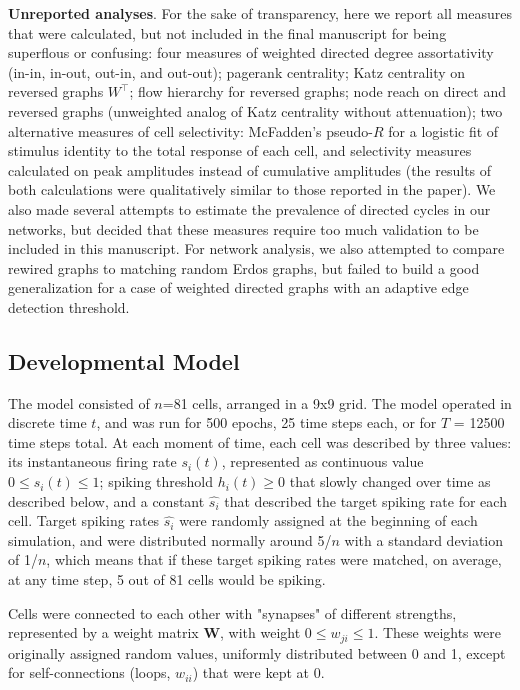 \documentclass{article}
\begin{document}
\textbf{Unreported analyses}. For the sake of transparency, here we report all measures that were calculated, but not included in the final manuscript for being superflous or confusing: four measures of weighted directed degree assortativity (in-in, in-out, out-in, and out-out); pagerank centrality; Katz centrality on reversed graphs $W^\top$; flow hierarchy for reversed graphs; node reach on direct and reversed graphs (unweighted analog of Katz centrality without attenuation); two alternative measures of cell selectivity: McFadden’s pseudo-$R$ for a logistic fit of stimulus identity to the total response of each cell, and selectivity measures calculated on peak amplitudes instead of cumulative amplitudes (the results of both calculations were qualitatively similar to those reported in the paper). We also made several attempts to estimate the prevalence of directed cycles in our networks, but decided that these measures require too much validation to be included in this manuscript. For network analysis, we also attempted to compare rewired graphs to matching random Erdos graphs, but failed to build a good generalization for a case of weighted directed graphs with an adaptive edge detection threshold.

\subsection*{Developmental Model}

The model consisted of $n$=81 cells, arranged in a 9x9 grid. The model operated in discrete time $t$, and was run for 500 epochs, 25 time steps each, or for $T$ = 12500 time steps total. At each moment of time, each cell was described by three values: its instantaneous firing rate $s_i(t)$, represented as continuous value $0 \leqslant s_i(t) \leqslant 1$; spiking threshold $h_i(t) \geqslant 0$ that slowly changed over time as described below, and a constant $\hat{s_i}$ that described the target spiking rate for each cell. Target spiking rates $\hat{s_i}$ were randomly assigned at the beginning of each simulation, and were distributed normally around 5/$n$ with a standard deviation of 1/$n$, which means that if these target spiking rates were matched, on average, at any time step, 5 out of 81 cells would be spiking.

Cells were connected to each other with "synapses" of different strengths, represented by a weight matrix \textbf{W}, with weight $0 \leqslant w_{ji} \leqslant 1$. These weights were originally assigned random values, uniformly distributed between 0 and 1, except for self-connections (loops, $w_{ii}$) that were kept at 0.
\end{document}

